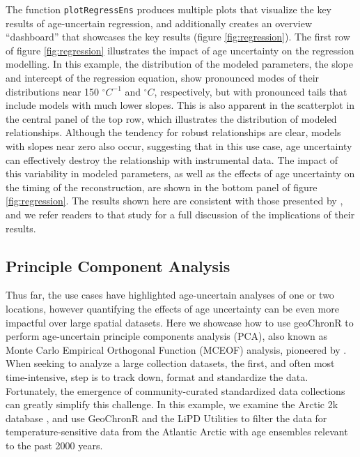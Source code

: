 \documentclass[gchron, manuscript]{copernicus}
\begin{document}
The function \texttt{plotRegressEns} produces multiple plots that visualize the key results of age-uncertain regression, and additionally creates an overview ``dashboard'' that showcases the key results (figure \ref{fig:regression}).
The first row of figure \ref{fig:regression} illustrates the impact of age uncertainty on the regression modelling.
In this example, the distribution of the modeled parameters, the slope and intercept of the regression equation, show pronounced modes of their distributions near 150 \(^\circ C^{-1}\) and \(^\circ C\), respectively, but with pronounced tails that include models with much lower slopes.
This is also apparent in the scatterplot in the central panel of the top row, which illustrates the distribution of modeled relationships.
Although the tendency for robust relationships are clear, models with slopes near zero also occur, suggesting that in this use case, age uncertainty can effectively destroy the relationship with instrumental data.
The impact of this variability in modeled parameters, as well as the effects of age uncertainty on the timing of the reconstruction, are shown in the bottom panel of figure \ref{fig:regression}.
The results shown here are consistent with those presented by \citet{Boldt2015}, and we refer readers to that study for a full discussion of the implications of their results.

\hypertarget{sec:pca}{%
\subsection{Principle Component Analysis}\label{sec:pca}}

Thus far, the use cases have highlighted age-uncertain analyses of one or two locations, however quantifying the effects of age uncertainty can be even more impactful over large spatial datasets.
Here we showcase how to use geoChronR to perform age-uncertain principle components analysis (PCA), also known as Monte Carlo Empirical Orthogonal Function (MCEOF) analysis, pioneered by \citet{anchukaitis2013mceof}.
When seeking to analyze a large collection datasets, the first, and often most time-intensive, step is to track down, format and standardize the data.
Fortunately, the emergence of community-curated standardized data collections \citetext{\citealp[e.g.][]{PAGES2K_ngeo2013_short}; \citealp{pages2k2017}; \citealp[ ]{kaufman2020temp12k}; \citealp{konecky2020iso2k}} can greatly simplify this challenge.
In this example, we examine the Arctic 2k database \citep{McKayKaufman2014}, and use GeoChronR and the LiPD Utilities to filter the data for temperature-sensitive data from the Atlantic Arctic with age ensembles relevant to the past 2000 years.
\end{document}
